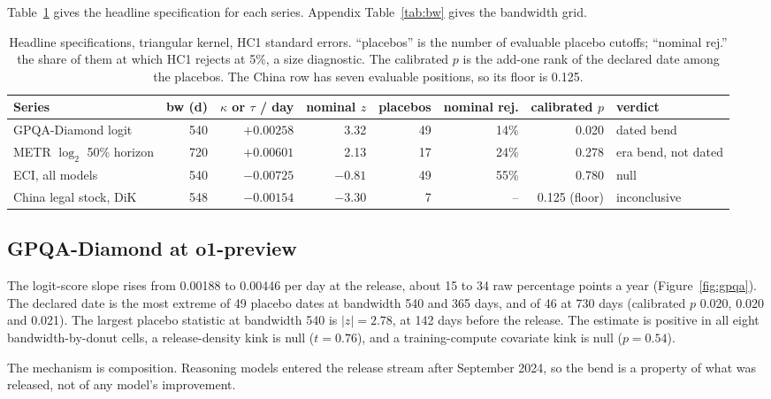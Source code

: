 \documentclass[11pt]{article}
\begin{document}
Table~\ref{tab:headline} gives the headline specification for each series. Appendix
Table~\ref{tab:bw} gives the bandwidth grid.

\begin{table}[t]
\centering
\small
\begin{tabular}{@{}lrrrrrrl@{}}
\toprule
Series & bw (d) & $\kappa$ or $\tau$ / day & nominal $z$ & placebos & nominal rej. & calibrated $p$ & verdict \\
\midrule
GPQA-Diamond logit & 540 & $+0.00258$ & 3.32 & 49 & 14\% & 0.020 & dated bend \\
METR $\log_2$ 50\% horizon & 720 & $+0.00601$ & 2.13 & 17 & 24\% & 0.278 & era bend, not dated \\
ECI, all models & 540 & $-0.00725$ & $-0.81$ & 49 & 55\% & 0.780 & null \\
China legal stock, DiK & 548 & $-0.00154$ & $-3.30$ & 7 & -- & 0.125 (floor) & inconclusive \\
\bottomrule
\end{tabular}
\caption{Headline specifications, triangular kernel, HC1 standard errors. ``placebos''
is the number of evaluable placebo cutoffs; ``nominal rej.'' the share of them at
which HC1 rejects at 5\%, a size diagnostic. The calibrated $p$ is the add-one rank of
the declared date among the placebos. The China row has seven evaluable positions, so
its floor is 0.125.}
\label{tab:headline}
\end{table}

\subsection{GPQA-Diamond at o1-preview}\label{sec:gpqa}

The logit-score slope rises from 0.00188 to 0.00446 per day at the release, about 15 to
34 raw percentage points a year (Figure~\ref{fig:gpqa}). The declared date is the most
extreme of 49 placebo dates at bandwidth 540 and 365 days, and of 46 at 730 days
(calibrated $p$ 0.020, 0.020 and 0.021). The largest placebo statistic at bandwidth 540
is $|z| = 2.78$, at 142 days before the release. The estimate is positive in all eight
bandwidth-by-donut cells, a release-density kink is null ($t = 0.76$), and a
training-compute covariate kink is null ($p = 0.54$).

The mechanism is composition. Reasoning models entered the release stream after
September 2024, so the bend is a property of what was released, not of any model's
improvement.
\end{document}
